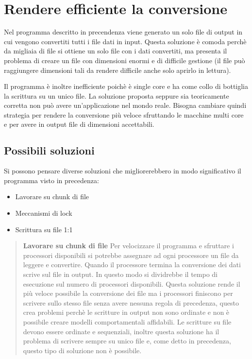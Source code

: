 \documentclass[../main.tex]{subfiles}
\begin{document}
\section{Rendere efficiente la conversione}

Nel programma descritto in precendenza viene generato un solo file di output in cui vengono convertiti tutti i file dati in input. Questa soluzione è comoda perchè da migliaia di file si ottiene un solo file con i dati convertiti, ma presenta il problema di creare un file con dimensioni enormi e di difficile gestione (il file può raggiungere dimensioni tali da rendere difficile anche solo aprirlo in lettura).


Il programma è inoltre inefficiente poichè è single core e ha come collo di bottiglia la scrittura su un unico file. 
La soluzione proposta seppure sia teoricamente corretta non può avere un'applicazione nel mondo reale. Bisogna cambiare quindi strategia per rendere la conversione più veloce sfruttando le macchine multi core e per avere in output file di dimensioni accettabili.

\subsection{Possibili soluzioni}
Si possono pensare diverse soluzioni che migliorerebbero in modo significativo il programma visto in precedenza:

\begin{itemize}
				\item Lavorare su chunk di file
				\item Meccanismi di lock
				\item Scrittura su file 1:1
\end{itemize}

\begin{verse}
\textbf{Lavorare su chunk di file}
Per velocizzare il programma e sfruttare i processori disponibili si potrebbe assegnare ad ogni processore un file da leggere e convertire. Quando il processore termina la conversione dei dati scrive sul file in output. In questo modo si dividrebbe il tempo di esecuzione sul numero di processori disponibili. 
Questa soluzione rende il più veloce possibile la conversione dei file ma i processori finiscono per scrivere sullo stesso file senza avere nessuna regola di precedenza, questo crea problemi perchè le scritture in output non sono ordinate e non è possibile creare modelli comportamentali affidabili. Le scritture su file devono essere ordinate e sequenziali, inoltre questa soluzione ha il problema di scrivere sempre su unico file e, come detto in precedenza, questo tipo di soluzione non è possibile.
\end{verse}
\end{document}
